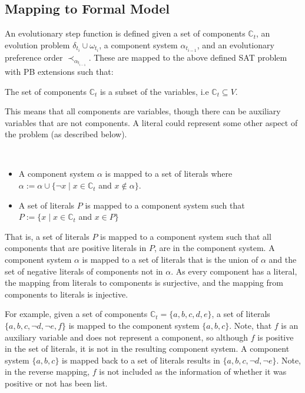 \subsection{Mapping to Formal Model}
An evolutionary step function is defined given a set of components $\mathbb{C}_t$, an evolution problem $\delta_{t_i} \cup \omega_{t_i}$,
a component system $\alpha_{t_{i-1}}$, and an evolutionary preference order $\prec_{\alpha_{t_{i-1}}}$.
These are mapped to the above defined SAT problem with PB extensions such that:
\begin{defs}
The set of components $\mathbb{C}_t$ is a subset of the variables, i.e $\mathbb{C}_t \subseteq V$.
\end{defs}
This means that all components are variables, though there can be auxiliary variables that are not components.
A literal could represent some other aspect of the problem (as described below).

\begin{defs}
{\ }
\begin{itemize}
  \item A component system $\alpha$ is mapped to a set of literals where $\alpha := \alpha \cup \{\neg x \mid x \in \mathbb{C}_t$ and $ x \not \in \alpha\}$.
  \item A set of literals $P$ is mapped to a component system such that $P := \{x \mid x \in \mathbb{C}_t$ and $x \in P\}$
\end{itemize}
\end{defs}
That is, a set of literals $P$ is mapped to a component system such that all components that are positive literals in $P$, are in the component system.
A component system $\alpha$ is mapped to a set of literals that is the union of $\alpha$ and the set of negative literals of components not in $\alpha$.
As every component has a literal, the mapping from literals to components is surjective, and the mapping from components to literals is injective.

For example, given a set of components $\mathbb{C}_t = \{a,b,c,d,e\}$, a set of literals $\{a,b,c,\neg d,\neg e,f\}$ is mapped to the component system $\{a,b,c\}$.
Note, that $f$ is an auxiliary variable and does not represent a component, so although $f$ is positive in the set of literals, it is not in the resulting component system.
A component system $\{a,b,c\}$ is mapped back to a set of literals results in $\{a,b,c,\neg d,\neg e\}$.
Note, in the reverse mapping, $f$ is not included as the information of whether it was positive or not has been list.

